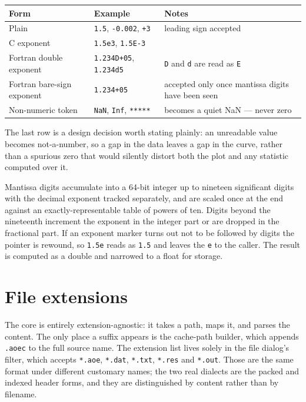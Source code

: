 \documentclass[11pt,a4paper,oneside]{report}
\newcommand{\code}[1]{\texttt{#1}}
\begin{document}
\begin{center}
\small
\begin{tabular}{@{}p{}p{}p{}@{}}
\toprule
\textbf{Form} & \textbf{Example} & \textbf{Notes} \\
\midrule
Plain & \code{1.5}, \code{-0.002}, \code{+3} & leading sign accepted \\
C exponent & \code{1.5e3}, \code{1.5E-3} & \\
Fortran double exponent & \code{1.234D+05}, \code{1.234d5} & \code{D} and \code{d} are read as \code{E} \\
Fortran bare-sign exponent & \code{1.234+05} & accepted only once mantissa digits have been seen \\
Non-numeric token & \code{NaN}, \code{Inf}, \code{*****} & becomes a quiet NaN --- never zero \\
\bottomrule
\end{tabular}
\end{center}

The last row is a design decision worth stating plainly: an unreadable value
becomes not-a-number, so a gap in the data leaves a gap in the curve, rather than
a spurious zero that would silently distort both the plot and any statistic
computed over it.

Mantissa digits accumulate into a 64-bit integer up to nineteen significant
digits with the decimal exponent tracked separately, and are scaled once at the
end against an exactly-representable table of powers of ten. Digits beyond the
nineteenth increment the exponent in the integer part or are dropped in the
fractional part. If an exponent marker turns out not to be followed by digits the
pointer is rewound, so \code{1.5e} reads as \code{1.5} and leaves the \code{e} to
the caller. The result is computed as a double and narrowed to a float for
storage.

\section{File extensions}

The core is entirely extension-agnostic: it takes a path, maps it, and parses the
content. The only place a suffix appears is the cache-path builder, which appends
\code{.aoec} to the full source name. The extension list lives solely in the file
dialog's filter, which accepts \code{*.aoe}, \code{*.dat}, \code{*.txt},
\code{*.res} and \code{*.out}. Those are the same format under different
customary names; the two real dialects are the packed and indexed header forms,
and they are distinguished by content rather than by filename.
\end{document}
